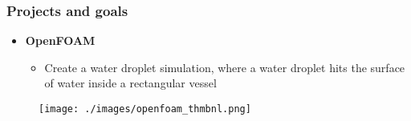 \begin{frame}
\frametitle{Projects and goals}

\begin{itemize}
	\item<1-> \textbf{OpenFOAM}
	\begin{itemize}
		\item<1-> Create a water droplet simulation, where a water droplet hits the surface of water inside a rectangular vessel
	\end{itemize}
\end{itemize}
\begin{figure}
	\texttt{[image: ./images/openfoam\_thmbnl.png]}
\end{figure}

\end{frame}
